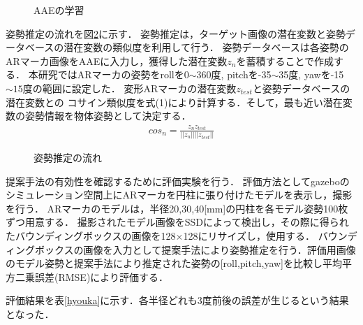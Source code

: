 \documentclass{jsarticle}
\begin{document}
\begin{figure}[ht]
\vspace{0zh}
\setlength{\epsfxsize}{7.5cm}
\centerline{}
\vspace{0zh}
\caption{AAEの学習}
\label{BB}
\vspace{-2zh}
\end{figure}




姿勢推定の流れを図\ref{GG}に示す．
姿勢推定は，ターゲット画像の潜在変数と姿勢データベースの潜在変数の類似度を利用して行う．
姿勢データベースは各姿勢のARマーカ画像をAAEに入力し，獲得した潜在変数$z_n$を蓄積することで作成する．
本研究ではARマーカの姿勢をrollを0$\sim$360度, pitchを-35$\sim$35度, yawを-15$\sim15$度の範囲に設定した．
変形ARマーカの潜在変数$z_{test}$と姿勢データベースの潜在変数との
コサイン類似度を式(1)により計算する．そして，最も近い潜在変数の姿勢情報を物体姿勢として決定する．
\begin{eqnarray}
\label{cos}
cos_n=\frac{z_n z_{test}}{||z_n|| ||z_{test}||}
\end{eqnarray}


\begin{figure}[ht]
\vspace{0zh}
\setlength{\epsfxsize}{7.5cm}
\centerline{}
\vspace{0zh}
\caption{姿勢推定の流れ}
\label{GG}
\vspace{-1.0zh}
\end{figure}





提案手法の有効性を確認するために評価実験を行う．
評価方法としてgazeboのシミュレーション空間上にARマーカを円柱に張り付けたモデルを表示し，撮影を行う．
ARマーカのモデルは，半径20,30,40[mm]の円柱を各モデル姿勢100枚ずつ用意する．
撮影されたモデル画像をSSDによって検出し，その際に得られたバウンディングボックスの画像を128$\times$128にリサイズし，使用する．
バウンディングボックスの画像を入力として提案手法により姿勢推定を行う．評価用画像のモデル姿勢と提案手法により推定された姿勢の[roll,pitch,yaw]を比較し平均平方二乗誤差(RMSE)により評価する．

評価結果を表\ref{hyouka}に示す．各半径どれも3度前後の誤差が生じるという結果となった．
\end{document}
